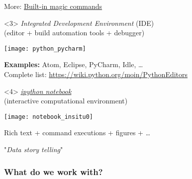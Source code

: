 \begin{frame}[fragile, c]
\begin{onlyenv}
More: \href{http://ipython.readthedocs.org/en/stable/interactive/magics.html?highlight=magic#built-in-magic-commands}{Built-in magic commands}
\end{onlyenv}


\begin{onlyenv}<3> 
\textit{Integrated Development Environment} (IDE)\\
(editor + build automation tools + debugger)

\vfill
\texttt{[image: python\_pycharm]}
\vfill

\textbf{Examples:} Atom, Eclipse, PyCharm, Idle, \ldots\\
Complete list: \url{https://wiki.python.org/moin/PythonEditors}
\end{onlyenv}

\begin{onlyenv}<4>
\href{http://ipython.org/notebook.html}{\textit{ipython notebook}}\\
(interactive computational environment)

\vfill
\texttt{[image: notebook\_insitu0]}
\vfill

Rich text + command executions + figures + \ldots

"\textit{Data story telling}"
\end{onlyenv}

\end{frame}

\begin{frame}[c]
\frametitle{What do we work with?}
\huge
\faLaptop

\vfill 

\end{frame}
